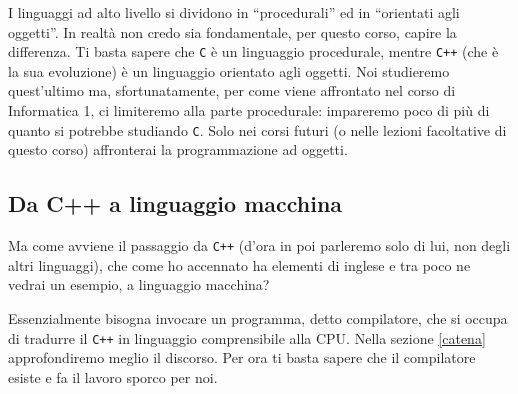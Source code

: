 I linguaggi ad alto livello si dividono in ``procedurali'' ed in ``orientati agli oggetti''. In realtà non credo sia fondamentale, per questo corso, capire la differenza. Ti basta sapere che \verb|C| è un linguaggio procedurale, mentre \verb|C++| (che è la sua evoluzione) è un linguaggio orientato agli oggetti. Noi studieremo quest'ultimo ma, sfortunatamente, per come viene affrontato nel corso di Informatica 1, ci limiteremo alla parte procedurale: impareremo poco di più di quanto si potrebbe studiando \verb|C|. Solo nei corsi futuri (o nelle lezioni facoltative di questo corso) affronterai la programmazione ad oggetti.

\subsection{Da C++ a linguaggio macchina}
Ma come avviene il passaggio da \verb|C++| (d'ora in poi parleremo solo di lui, non degli altri linguaggi), che come ho accennato ha elementi  di inglese e tra poco ne vedrai un esempio, a linguaggio macchina? 

Essenzialmente bisogna invocare un programma, detto compilatore, che si occupa di tradurre il \verb|C++| in linguaggio comprensibile alla CPU. Nella sezione \ref{catena} approfondiremo meglio il discorso. Per ora ti basta sapere che il compilatore esiste e fa il lavoro sporco per noi.
\\

